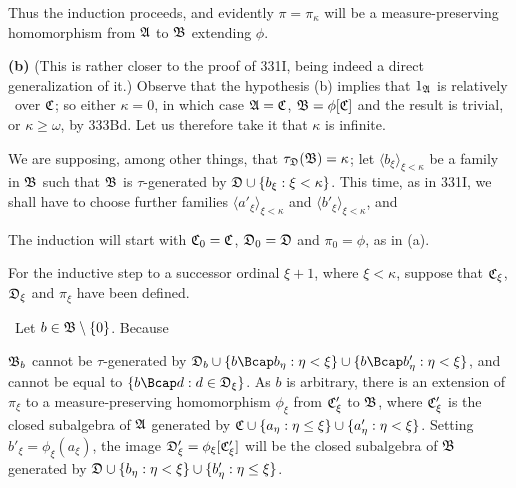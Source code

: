 {Thus the induction proceeds, and evidently $\pi=\pi_{\kappa}$ will be a
measure-preserving homomorphism from $\frak A$ to $\frak B$ extending
$\phi$.

\medskip

{\bf (b)} (This is rather closer to the proof of 331I, being indeed a
direct generalization of it.)   Observe that the hypothesis (b) implies
that $1_{\frak A}$ is relatively \Mth\ over $\frak C$;  so
either $\kappa=0$, in which case $\frak A=\frak C$, $\frak B=\phi[\frak C]$
and the result is trivial, or $\kappa\ge\omega$, by 333Bd.   Let us
therefore take it that $\kappa$ is infinite.

We are supposing, among other things,
that $\tau_{\frak D}(\frak B)=\kappa$;  let
$\langle b_{\xi}\rangle_{\xi<\kappa}$ be a family in $\frak B$ such that
$\frak B$ is $\tau$-generated by $\frak D\cup\{b_{\xi}:\xi<\kappa\}$.
This time, as in 331I, we shall have to choose further families
$\langle a'_{\xi}\rangle_{\xi<\kappa}$ and
$\langle b'_{\xi}\rangle_{\xi<\kappa}$, and




\noindent The induction will start with $\frak C_0=\frak C$, $\frak
D_0=\frak D$ and $\pi_0=\phi$, as in (a).

\medskip

 For the inductive step to a successor ordinal $\xi+1$,
where $\xi<\kappa$, suppose that $\frak C_{\xi}$, $\frak D_{\xi}$ and
$\pi_{\xi}$ have been defined.

\medskip

\qquad\grheada\ Let $b\in\frak B\setminus\{0\}$.  Because


\noindent $\frak B_b$ cannot be $\tau$-generated by
$\frak D_b\cup\{b\Bcap b_{\eta}:\eta<\xi\}
  \cup\{b\Bcap b'_{\eta}:\eta<\xi\}$, and
cannot be equal to $\{b\Bcap d:d\in\frak D_{\xi}\}$.   As $b$ is
arbitrary, there is an extension of $\pi_{\xi}$ to a
measure-preserving homomorphism $\phi_{\xi}$ from $\frak C'_{\xi}$ to
$\frak B$,
where $\frak C'_{\xi}$ is the closed subalgebra of $\frak A$ generated
by $\frak C\cup\{a_{\eta}:\eta\le\xi\}\cup\{a'_{\eta}:\eta<\xi\}$.
Setting $b'_{\xi}=\phi_{\xi}(a_{\xi})$, the image
$\frak D'_{\xi}=\phi_{\xi}[\frak C'_{\xi}]$ will be the closed subalgebra
of $\frak B$ generated by
$\frak D\cup\{b_{\eta}:\eta<\xi\}\cup\{b'_{\eta}:\eta\le \xi\}$.

}
